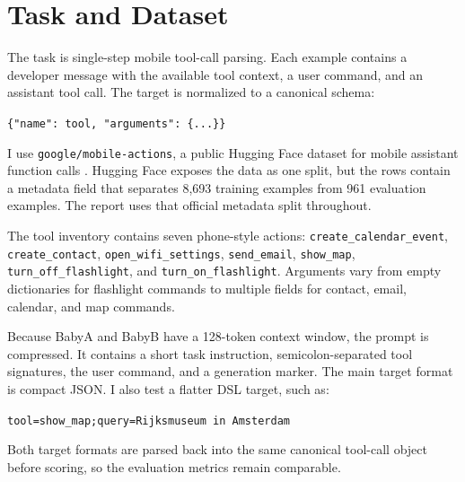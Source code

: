 \section{Task and Dataset}

The task is single-step mobile tool-call parsing. Each example contains a developer message with the available tool context, a user command, and an assistant tool call. The target is normalized to a canonical schema:

\begin{center}
\small
\texttt{\{"name": tool, "arguments": \{...\}\}}
\end{center}

I use \texttt{google/mobile-actions}, a public Hugging Face dataset for mobile assistant function calls \citep{google-mobile-actions}. Hugging Face exposes the data as one split, but the rows contain a metadata field that separates 8,693 training examples from 961 evaluation examples. The report uses that official metadata split throughout.

The tool inventory contains seven phone-style actions: \texttt{create\_calendar\_event}, \texttt{create\_contact}, \texttt{open\_wifi\_settings}, \texttt{send\_email}, \texttt{show\_map}, \texttt{turn\_off\_flashlight}, and \texttt{turn\_on\_flashlight}. Arguments vary from empty dictionaries for flashlight commands to multiple fields for contact, email, calendar, and map commands.

Because BabyA and BabyB have a 128-token context window, the prompt is compressed. It contains a short task instruction, semicolon-separated tool signatures, the user command, and a generation marker. The main target format is compact JSON. I also test a flatter DSL target, such as:

\begin{center}
\small
\texttt{tool=show\_map;query=Rijksmuseum in Amsterdam}
\end{center}

Both target formats are parsed back into the same canonical tool-call object before scoring, so the evaluation metrics remain comparable.
